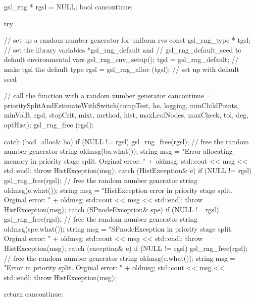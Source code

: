 \begin{DoxyCode}
{
    gsl_rng * rgsl = NULL;
    bool cancontinue;

    try {
        // set up a random number generator for uniform rvs
        const gsl_rng_type * tgsl;
        // set the library variables *gsl_rng_default and
        // gsl_rng_default_seed to default environmental vars
        gsl_rng_env_setup();
        tgsl = gsl_rng_default; // make tgsl the default type
        rgsl = gsl_rng_alloc (tgsl); // set up with default seed

        // call the function with a random number generator
        cancontinue = prioritySplitAndEstimateWithSwitch(compTest, he, logging,
       minChildPoints, 
                        minVolB, rgsl, stopCrit, mixt, method, hist,
                        maxLeafNodes, maxCheck, tol, deg, optHist);
        gsl_rng_free (rgsl);
    }

    catch (bad_alloc& ba) {
        if (NULL != rgsl) gsl_rng_free(rgsl); // free the random number
       generator
        string oldmsg(ba.what());
        string msg = "Error allocating memory in priority stage split.  Orginal
       error: "
                                     + oldmsg;
        std::cout << msg << std::endl;
        throw HistException(msg);
    }
    catch (HistException& e) {
        if (NULL != rgsl) gsl_rng_free(rgsl); // free the random number
       generator
        string oldmsg(e.what());
        string msg = "HistException error in priority stage split.  Orginal
       error: "
                                    + oldmsg;
        std::cout << msg << std::endl;
        throw HistException(msg);
    }
    catch (SPnodeException& spe) {
        if (NULL != rgsl) gsl_rng_free(rgsl); // free the random number
       generator
        string oldmsg(spe.what());
        string msg = "SPnodeException in priority stage split.  Orginal error: 
      "
                                    + oldmsg;
        std::cout << msg << std::endl;
        throw HistException(msg);
    }
    catch (exception& e) {
        if (NULL != rgsl) gsl_rng_free(rgsl); // free the random number
       generator
        string oldmsg(e.what());
        string msg = "Error in priority split.  Orginal error: " + oldmsg;
        std::cout << msg << std::endl;
        throw HistException(msg);
    }
   
   return cancontinue;
}
\end{DoxyCode}
